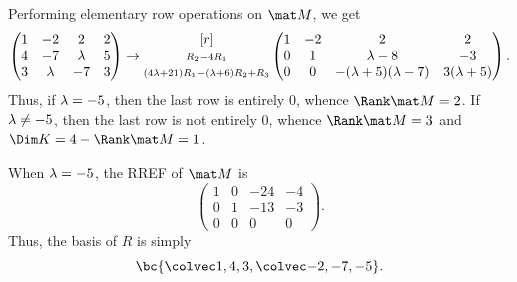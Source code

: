 \begin{solution}
    \begin{ppart}
        Performing elementary row operations on $\mat M$, we get \[\begin{pmatrix}1 & -2 & 2 & 2 \\ 4 & -7 & \lambda & 5 \\ 3 & \lambda & -7 & 3\end{pmatrix} \rightarrow \begin{matrix}[r] \\ \scriptstyle R_2 - 4R_1 \\ \scriptstyle (4\lambda+21)R_1 - (\lambda+6)R_2 + R_3\end{matrix}\begin{pmatrix}1 & -2 & 2 & 2 \\ 0 & 1 & \lambda-8 & - 3 \\ 0 & 0 & -(\lambda+5)(\lambda-7) & 3(\lambda + 5)\end{pmatrix}.\] Thus, if $\lambda = -5$, then the last row is entirely 0, whence $\Rank \mat M = 2$. If $\lambda \neq -5$, then the last row is not entirely 0, whence $\Rank \mat M = 3$ and $\Dim K = 4 - \Rank \mat M = 1$.
    \end{ppart}
    \begin{ppart}
        When $\lambda = -5$, the RREF of $\mat M$ is \[\begin{pmatrix}1 & 0 & -24 & -4 \\ 0 & 1 & -13 & -3 \\ 0 & 0 & 0 & 0\end{pmatrix}.\] Thus, the basis of $R$ is simply \[\bc{\cveciii143, \cveciii{-2}{-7}{-5}}.\]


\end{ppart}
\end{solution}
